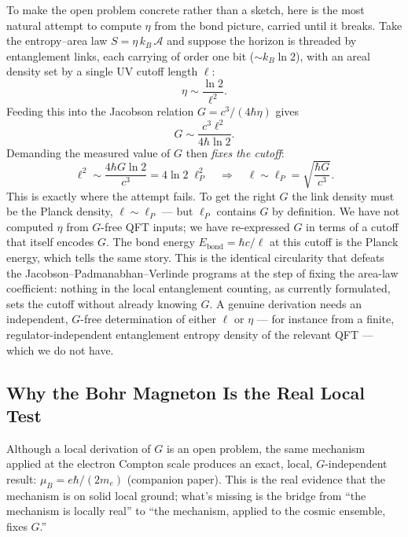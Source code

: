 \documentclass[11pt,letterpaper]{article}
\begin{document}
To make the open problem concrete rather than a sketch, here is the most
natural attempt to compute $\eta$ from the bond picture, carried until it
breaks. Take the entropy--area law $S = \eta\, k_B\, \mathcal{A}$ and suppose
the horizon is threaded by entanglement links, each carrying of order one bit
($\sim k_B \ln 2$), with an areal density set by a single UV cutoff length
$\ell$:
\begin{equation}
  \eta \sim \frac{\ln 2}{\ell^2}.
\end{equation}
Feeding this into the Jacobson relation $G = c^3/(4\hbar\eta)$ gives
\begin{equation}
  G \sim \frac{c^3 \ell^2}{4 \hbar \ln 2}.
\end{equation}
Demanding the measured value of $G$ then \emph{fixes the cutoff}:
\begin{equation}
  \ell^2 \sim \frac{4 \hbar G \ln 2}{c^3} = 4\ln 2\;\ell_P^2
  \quad\Longrightarrow\quad
  \ell \sim \ell_P = \sqrt{\frac{\hbar G}{c^3}}.
\end{equation}
This is exactly where the attempt fails. To get the right $G$ the link density
must be the Planck density, $\ell \sim \ell_P$ --- but $\ell_P$ contains $G$ by
definition. We have not computed $\eta$ from $G$-free QFT inputs; we have
re-expressed $G$ in terms of a cutoff that itself encodes $G$. The bond energy
$E_{\mathrm{bond}} = \hbar c/\ell$ at this cutoff is the Planck energy, which
tells the same story. This is the identical circularity that defeats the
Jacobson--Padmanabhan--Verlinde programs at the step of fixing the area-law
coefficient: nothing in the local entanglement counting, as currently
formulated, sets the cutoff without already knowing $G$. A genuine derivation
needs an independent, $G$-free determination of either $\ell$ or $\eta$ --- for
instance from a finite, regulator-independent entanglement entropy density of
the relevant QFT --- which we do not have.

\subsection{Why the Bohr Magneton Is the Real Local Test}

Although a local derivation of $G$ is an open problem, the same
mechanism applied at the electron Compton scale produces an exact,
local, $G$-independent result: $\mu_B = e\hbar/(2 m_e)$ (companion
paper). This is the real evidence that the mechanism is on solid
local ground; what's missing is the bridge from ``the mechanism is
locally real'' to ``the mechanism, applied to the cosmic ensemble,
fixes $G$.''
\end{document}
